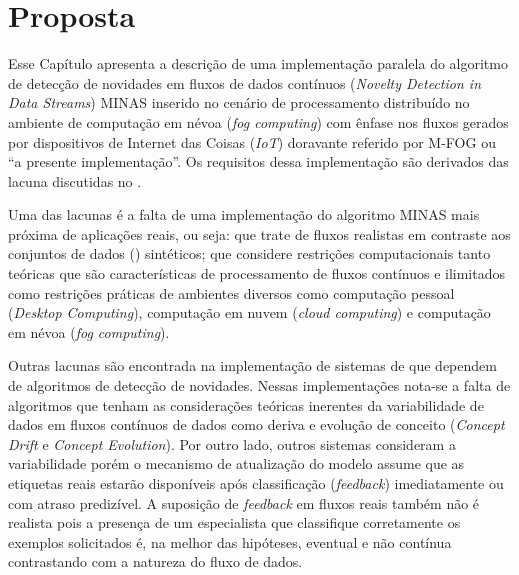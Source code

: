 \chapter{Proposta}\label{cha:proposta}

\newcommand{\fog}{\emph{fog computing}\xspace}
\newcommand{\iot}{\emph{IoT}\xspace}
\newcommand{\mfog}{M-FOG\xspace}

Esse Capítulo apresenta a descrição de uma implementação paralela do algoritmo
de detecção de novidades em fluxos de dados contínuos (\emph{Novelty Detection
in Data Streams}) MINAS inserido no cenário de processamento distribuído no
ambiente de computação em névoa (\fog) com ênfase nos fluxos gerados por
dispositivos de Internet das Coisas (\iot) doravante referido por \mfog ou 
``a presente implementação''.
Os requisitos dessa implementação são derivados das lacuna discutidas no
.

\newcommand{\cloud}{\emph{cloud computing}\xspace}
\newcommand{\drift}{\emph{Concept Drift}\xspace}
\newcommand{\evolution}{\emph{Concept Evolution}\xspace}

Uma das lacunas é a falta de uma implementação do algoritmo
MINAS mais próxima de aplicações reais, ou seja:
que trate de fluxos realistas em contraste aos conjuntos de dados (\datasets)
sintéticos;
que considere restrições computacionais tanto teóricas que são características
de processamento de fluxos contínuos e ilimitados como restrições práticas
de ambientes diversos como computação pessoal (\emph{Desktop Computing}), 
computação em nuvem (\cloud) e computação em névoa (\fog).

Outras lacunas são encontrada na implementação de sistemas de que dependem de
algoritmos de detecção de novidades. Nessas implementações nota-se a falta de
algoritmos que tenham as considerações teóricas inerentes da variabilidade de
dados em fluxos contínuos de dados como deriva e evolução de conceito (\drift e
\evolution).
Por outro lado, outros sistemas consideram a variabilidade porém o
mecanismo de atualização do modelo assume que as etiquetas reais estarão
disponíveis após classificação (\emph{feedback}) imediatamente ou com atraso
predizível.
A suposição de \emph{feedback} em fluxos reais também não é realista pois
a presença de um especialista que classifique corretamente os exemplos
solicitados é, na melhor das hipóteses, eventual e não contínua contrastando com
a natureza do fluxo de dados.

